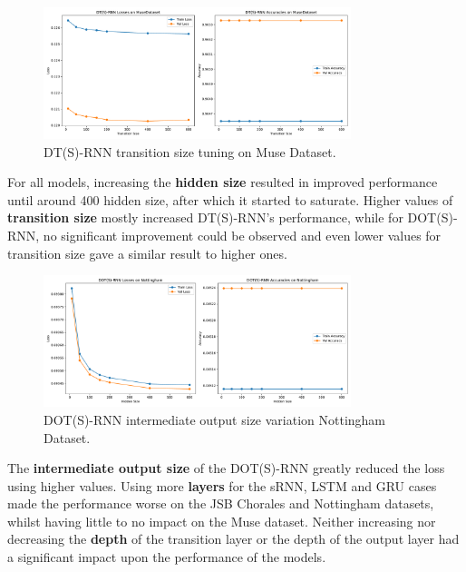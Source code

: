 \documentclass{article}
\begin{document}
\begin{figure}[H]
    \centering
    \includegraphics[width=0.8\textwidth]{Muse/DT(S)-RNN_MuseDataset_transition_sizes_comparison.pdf}
    \caption{DT(S)-RNN transition size tuning on Muse Dataset.}
    \label{fig:dts-transition-size-tuning-muse}
\end{figure}

For all models, increasing the \textbf{hidden size} resulted in improved performance until around 400 hidden size, after which it started to saturate.
Higher values of \textbf{transition size} mostly increased DT(S)-RNN's performance, while for DOT(S)-RNN, no significant improvement could be observed and even lower values for transition size gave a similar result to higher ones.

\begin{figure}[H]
    \centering
    \includegraphics[width=0.8\textwidth]{Nottingham/DOT(S)-RNN_Nottingham_intermediate_output_sizes_comparison.pdf}
    \caption{DOT(S)-RNN intermediate output size variation Nottingham Dataset.}
    \label{fig:dots-intermediate-output-size-tuning-Nottingham}
\end{figure}

The \textbf{intermediate output size} of the DOT(S)-RNN greatly reduced the loss using higher values.
Using more \textbf{layers} for the sRNN, LSTM and GRU cases made the performance worse on the JSB Chorales and Nottingham datasets, whilst having little to no impact on the Muse dataset.
Neither increasing nor decreasing the \textbf{depth} of the transition layer or the depth of the output layer had a significant impact upon the performance of the models. 
\end{document}
